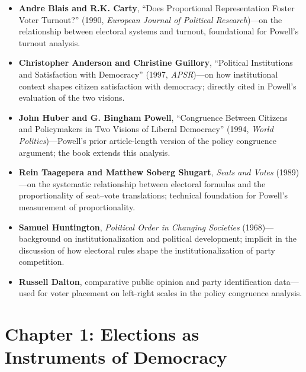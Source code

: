 \documentclass[12pt]{article}
\begin{document}
\begin{itemize}[leftmargin=*, itemsep=4pt]
    \item \textbf{Andre Blais and R.K. Carty}, ``Does Proportional Representation Foster Voter Turnout?'' (1990, \textit{European Journal of Political Research})---on the relationship between electoral systems and turnout, foundational for Powell's turnout analysis.
    \item \textbf{Christopher Anderson and Christine Guillory}, ``Political Institutions and Satisfaction with Democracy'' (1997, \textit{APSR})---on how institutional context shapes citizen satisfaction with democracy; directly cited in Powell's evaluation of the two visions.
    \item \textbf{John Huber and G. Bingham Powell}, ``Congruence Between Citizens and Policymakers in Two Visions of Liberal Democracy'' (1994, \textit{World Politics})---Powell's prior article-length version of the policy congruence argument; the book extends this analysis.
    \item \textbf{Rein Taagepera and Matthew Soberg Shugart}, \textit{Seats and Votes} (1989)---on the systematic relationship between electoral formulas and the proportionality of seat--vote translations; technical foundation for Powell's measurement of proportionality.
    \item \textbf{Samuel Huntington}, \textit{Political Order in Changing Societies} (1968)---background on institutionalization and political development; implicit in the discussion of how electoral rules shape the institutionalization of party competition.
    \item \textbf{Russell Dalton}, comparative public opinion and party identification data---used for voter placement on left-right scales in the policy congruence analysis.
\end{itemize}

\section{Chapter 1: Elections as Instruments of Democracy}
\end{document}
